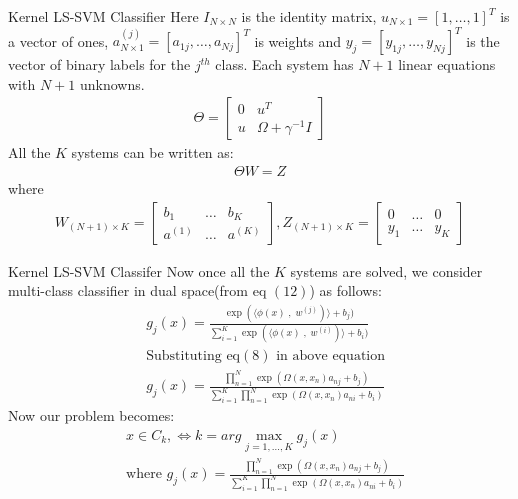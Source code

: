 \documentclass{beamer}
\begin{document}
    \begin{frame}{Kernel LS-SVM Classifier}
        Here $I_{N \times N}$ is the identity matrix, $u_{N \times 1} = [1,\ldots,1]^{T}$ is a vector of ones,
        $a^{(j)}_{N \times 1} = [a_{1j}, \ldots, a_{Nj}]^{T}$ is weights and $y_{j} = [y_{1j}, \ldots, y_{Nj}]^{T}$ is the
        vector of binary labels for the $j^{th}$ class.
        Each system has $N + 1$ linear equations with $N + 1$ unknowns.
        \begin{align}
            \Theta = \begin{bmatrix}
                         0 & u^{T}                 \\
                         u & \Omega + \gamma^{-1}I
            \end{bmatrix}
        \end{align}
        All the $K$ systems can be written as:
        \begin{align}
            \Theta W = Z
        \end{align}
        where
        \begin{align*}
            W_{(N+1) \times K} = \begin{bmatrix}
                                     b_{1}   & \ldots & b_{K}   \\
                                     a^{(1)} & \ldots & a^{(K)}
            \end{bmatrix}
            , Z_{(N+1) \times K} = \begin{bmatrix}
                                       0     & \ldots & 0     \\
                                       y_{1} & \ldots & y_{K}
            \end{bmatrix}
        \end{align*}
    \end{frame}
    \begin{frame}{Kernel LS-SVM Classifer}
        Now once all the $K$ systems are solved, we consider multi-class classifier in dual space(from eq $(12)$) as follows:
        \begin{align*}
            &g_{j}(x) = \frac{\exp(\langle \phi(x)\;,\; w^{(j)})\rangle + b_{j})}{\sum_{i=1}^{K} \exp(\langle \phi(x)\;,\; w^{(i)})\rangle + b_{i})}\\
            &\text{Substituting eq$(8)$ in above equation} \\
            &g_{j}(x) = \frac{\prod_{n=1}^{N}\exp(\Omega(x,x_{n})a_{nj} + b_{j})}{\sum_{i=1}^{K} \prod_{n=1}^{N}\exp(\Omega(x,x_{n})a_{ni} + b_{i})}
        \end{align*}
        Now our problem becomes:
        \begin{align*}
            & x \in C_{k}, \Leftrightarrow k= arg \max_{j=1,\ldots,K} g_{j}(x)\\
            & \text{where } g_{j}(x) = \frac{\prod_{n=1}^{N}\exp(\Omega(x,x_{n})a_{nj} + b_{j})}{\sum_{i=1}^{K} \prod_{n=1}^{N}\exp(\Omega(x,x_{n})a_{ni} + b_{i})}
        \end{align*}

    \end{frame}
\end{document}
